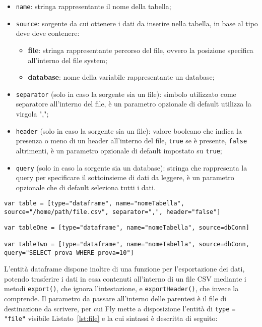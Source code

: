 \begin{itemize}
    \item \verb|name|: stringa rappresentante il nome della tabella;
    \item \verb|source|: sorgente da cui ottenere i dati da inserire nella tabella, in base al tipo deve deve contenere:
    \begin{itemize}
        \item \textbf{file}: stringa rappresentante percorso del file, ovvero la posizione specifica all'interno del file system;
        \item \textbf{database}: nome della variabile rappresentante un database;
    \end{itemize}
    \item \verb|separator| (solo in caso la sorgente sia un file): simbolo utilizzato come separatore all'interno del file, è un parametro opzionale di default utilizza la virgola ",";
    \item \verb|header| (solo in caso la sorgente sia un file): valore booleano che indica la presenza o meno di un header all'interno del file, \verb|true| se è presente, \verb|false| altrimenti, è un parametro opzionale di default impostato su \verb|true|;
    \item \verb|query| (solo in caso la sorgente sia un database): stringa che rappresenta la query per specificare il sottoinsieme di dati da leggere, è un parametro opzionale che di default seleziona tutti i dati.
\end{itemize}

\begin{lstlisting}[language=FLY,caption={Dichiarazione di entità dataframe creata a partire da un file.}, label={lst:dataframeFile}]
var table = [type="dataframe", name="nomeTabella", source="/home/path/file.csv", separator=",", header="false"]
\end{lstlisting}

\begin{lstlisting}[language=FLY,caption={Dichiarazione di entità dataframe creata a partire da una tabella MySQL con e senza l'utilizzo del parametro query.}, label={lst:dataframeDB}]
var tableOne = [type="dataframe", name="nomeTabella", source=dbConn]

var tableTwo = [type="dataframe", name="nomeTabella", source=dbConn, query="SELECT prova WHERE prova=10"]
\end{lstlisting}

L'entità dataframe dispone inoltre di una funzione per l'esportazione dei dati, potendo trasferire i dati in essa contenuti all'interno di un file CSV mediante i metodi \verb|export()|, che ignora l'intestazione, e \verb|exportHeader()|, che invece la comprende. Il parametro da passare all'interno delle parentesi è il file di destinazione da scrivere, per cui Fly mette a disposizione l'entità di \verb|type| \verb|=| \verb|"file"| visibile Listato~\ref{lst:file} e la cui sintassi è descritta di seguito:

